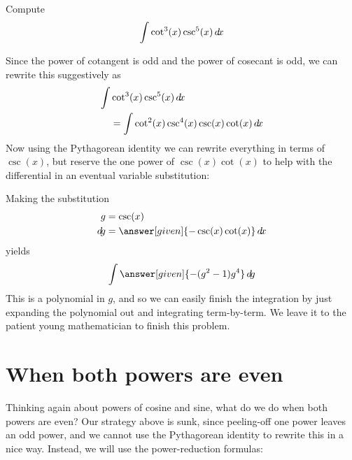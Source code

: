\documentclass{ximera}
\begin{document}
\begin{example}
  Compute
  \[
  \int \cot^3(x) \csc^5(x) \mathop{}\!d\! x
  \]
  \begin{explanation}
    Since the power of cotangent is odd and the power of cosecant is
    odd, we can rewrite this suggestively as
    \begin{align*}
      \int &\cot^3(x) \csc^5(x) \mathop{}\!d\! x \\
    &= \int\cot^2(x) \csc^4(x) \csc(x)\cot(x) \mathop{}\!d\! x
    \end{align*}
    Now using the Pythagorean identity we can rewrite everything in
    terms of $\csc(x)$, but reserve the one power of $\csc(x)\cot(x)$ to help
    with the differential in an eventual variable substitution:
    \begin{center}%
    \end{center}
    Making the substitution
    \begin{align*}
      g &= \csc(x)\\
      \d g &=\answer[given]{-\csc(x)\cot(x)} \d x
    \end{align*}
    yields
    \[
    \int \answer[given]{-(g^2-1)g^4} \d g
    \]
    This is a polynomial in $g$, and so we can easily finish the
    integration by just expanding the polynomial out and integrating
    term-by-term. We leave it to the patient young mathematician to
    finish this problem.
  \end{explanation}
\end{example}




\section{When both powers are even}

Thinking again about powers of cosine and sine, what do we do when
both powers are even?  Our strategy above is sunk, since peeling-off
one power leaves an odd power, and we cannot use the Pythagorean
identity to rewrite this in a nice way.  Instead, we will use the
power-reduction formulas:
\end{document}
